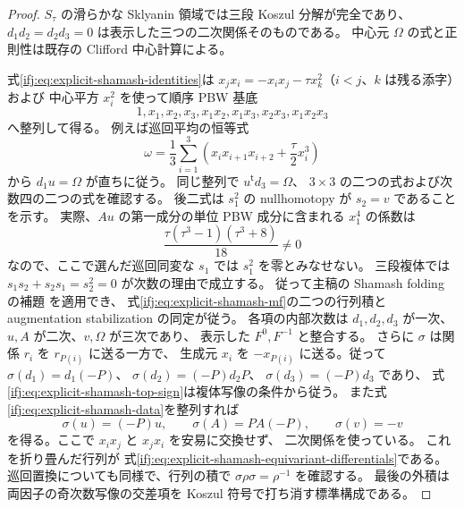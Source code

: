 \begin{proof}
$S_\tau$ の滑らかな Sklyanin 領域では三段 Koszul 分解が完全であり、
$d_1d_2=d_2d_3=0$ は表示した三つの二次関係そのものである。
中心元 $\Omega$ の式と正則性は既存の Clifford 中心計算による。

式\eqref{ifj:eq:explicit-shamash-identities}は
$x_jx_i=-x_ix_j-\tau x_k^2$（$i<j$、$k$ は残る添字）および
中心平方 $x_i^2$ を使って順序 PBW 基底
\[
 1,x_1,x_2,x_3,x_1x_2,x_1x_3,x_2x_3,x_1x_2x_3
\]
へ整列して得る。
例えば巡回平均の恒等式
\[
 \omega=\frac13\sum_{i=1}^3
   \left(x_ix_{i+1}x_{i+2}+\frac{\tau}{2}x_i^3\right)
\]
から $d_1u=\Omega$ が直ちに従う。
同じ整列で $u^{\mathsf t}d_3=\Omega$、
$3\times3$ の二つの式および次数四の二つの式を確認する。
後二式は $s_1^2$ の nullhomotopy が $s_2=v$ であることを示す。
実際、$Au$ の第一成分の単位 PBW 成分に含まれる
$x_1^4$ の係数は
\[
 \frac{\tau(\tau^3-1)(\tau^3+8)}{18}\ne0
\]
なので、ここで選んだ巡回同変な $s_1$ では
$s_1^2$ を零とみなせない。
三段複体では $s_1s_2+s_2s_1=s_2^2=0$ が次数の理由で成立する。
従って主稿の Shamash folding の補題
を適用でき、
式\eqref{ifj:eq:explicit-shamash-mf}の二つの行列積と
augmentation stabilization の同定が従う。
各項の内部次数は $d_1,d_2,d_3$ が一次、
$u,A$ が二次、$v,\Omega$ が三次であり、
表示した $F^0,F^{-1}$ と整合する。
さらに $\sigma$ は関係 $r_i$ を $r_{P(i)}$ に送る一方で、
生成元 $x_i$ を $-x_{P(i)}$ に送る。従って
$\sigma(d_1)=d_1(-P)$、
$\sigma(d_2)=(-P)d_2P$、
$\sigma(d_3)=(-P)d_3$ であり、
式\eqref{ifj:eq:explicit-shamash-top-sign}は複体写像の条件から従う。
また式\eqref{ifj:eq:explicit-shamash-data}を整列すれば
\[
 \sigma(u)=(-P)u,\qquad
 \sigma(A)=P A(-P),\qquad \sigma(v)=-v
\]
を得る。ここで $x_ix_j$ と $x_jx_i$ を安易に交換せず、
二次関係を使っている。
これを折り畳んだ行列が
式\eqref{ifj:eq:explicit-shamash-equivariant-differentials}である。
巡回置換についても同様で、行列の積で
$\sigma\rho\sigma=\rho^{-1}$ を確認する。
最後の外積は両因子の奇次数写像の交差項を
Koszul 符号で打ち消す標準構成である。
\end{proof}

